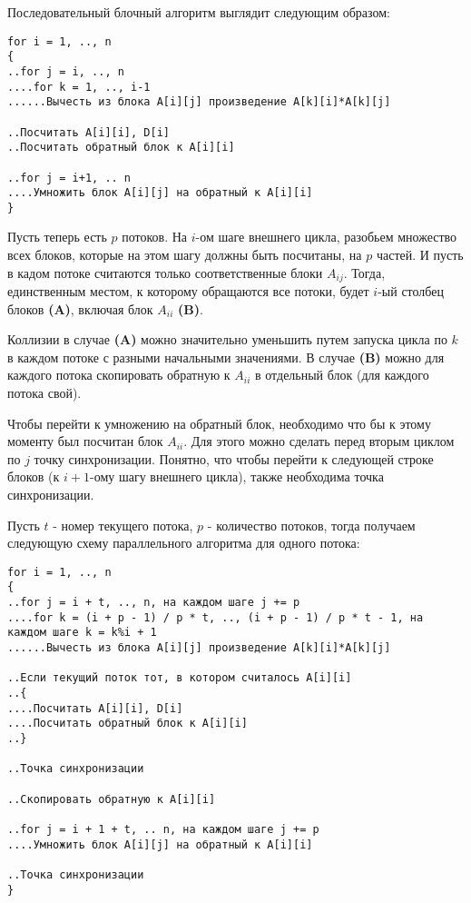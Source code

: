 \documentclass[12pt,a4paper]{article}
\begin{document}
Последовательный блочный алгоритм выглядит следующим образом:
\begin{verbatim}
for i = 1, .., n
{
..for j = i, .., n
....for k = 1, .., i-1
......Вычесть из блока A[i][j] произведение A[k][i]*A[k][j]

..Посчитать A[i][i], D[i]
..Посчитать обратный блок к A[i][i]

..for j = i+1, .. n
....Умножить блок A[i][j] на обратный к A[i][i]
}	
\end{verbatim}

Пусть теперь есть $p$ потоков. На $i$-ом шаге внешнего цикла, разобьем множество всех блоков, которые на этом шагу должны быть посчитаны, на $p$ частей. И пусть в кадом потоке считаются только соответственные блоки $A_{ij}$. Тогда, единственным местом, к которому обращаются все потоки, будет $i$-ый столбец блоков \textbf{(A)}, включая блок $A_{ii}$ \textbf{(B)}.

Коллизии в случае \textbf{(A)} можно значительно уменьшить путем запуска цикла по $k$ в каждом потоке с разными начальными значениями. В случае \textbf{(B)} можно для каждого потока скопировать обратную к $A_{ii}$ в отдельный блок (для каждого потока свой).

Чтобы перейти к умножению на обратный блок, необходимо что бы к этому моменту был посчитан блок $A_{ii}$. Для этого можно сделать перед вторым циклом по $j$ точку синхронизации. Понятно, что чтобы перейти к следующей строке блоков (к $i+1$-ому шагу внешнего цикла), также необходима точка синхронизации.

Пусть $t$ - номер текущего потока, $p$ - количество потоков, тогда получаем следующую схему параллельного алгоритма для одного потока:
\begin{verbatim}
for i = 1, .., n
{
..for j = i + t, .., n, на каждом шаге j += p
....for k = (i + p - 1) / p * t, .., (i + p - 1) / p * t - 1, на каждом шаге k = k%i + 1
......Вычесть из блока A[i][j] произведение A[k][i]*A[k][j]

..Если текущий поток тот, в котором считалось A[i][i]
..{
....Посчитать A[i][i], D[i]
....Посчитать обратный блок к A[i][i]
..}

..Точка синхронизации

..Скопировать обратную к A[i][i]

..for j = i + 1 + t, .. n, на каждом шаге j += p
....Умножить блок A[i][j] на обратный к A[i][i]

..Точка синхронизации
}	
\end{verbatim}
\end{document}
